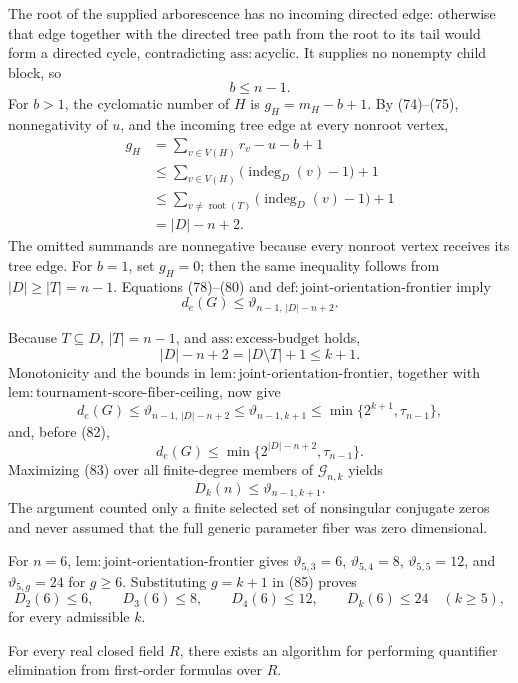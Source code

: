 The root of the supplied arborescence has no incoming directed edge: otherwise that edge together with the directed tree path from the root to its tail would form a directed cycle, contradicting \(\mathrm{ass:acyclic}\).  It supplies no nonempty child block, so
\[
 b\leq n-1.
\tag{79}
\]
For \(b>1\), the cyclomatic number of \(H\) is \(g_H=m_H-b+1\).  By (74)--(75), nonnegativity of \(u\), and the incoming tree edge at every nonroot vertex,
\[
\begin{aligned}
 g_H
 &=\sum_{v\in V(H)}r_v-u-b+1\\
 &\leq\sum_{v\in V(H)}\bigl(\operatorname{indeg}_D(v)-1\bigr)+1\\
 &\leq\sum_{v\ne\operatorname{root}(T)}
       \bigl(\operatorname{indeg}_D(v)-1\bigr)+1\\
 &=|D|-n+2.
\end{aligned}
\tag{80}
\]
The omitted summands are nonnegative because every nonroot vertex receives its tree edge.  For \(b=1\), set \(g_H=0\); then the same inequality follows from \(|D|\geq|T|=n-1\).  Equations (78)--(80) and \(\mathrm{def:joint\mbox{-}orientation\mbox{-}frontier}\) imply
\[
 d_e(G)\leq\vartheta_{n-1,\,|D|-n+2}.
\tag{81}
\]

Because \(T\subseteq D\), \(|T|=n-1\), and \(\mathrm{ass:excess\mbox{-}budget}\) holds,
\[
 |D|-n+2=|D\setminus T|+1\leq k+1.
\tag{82}
\]
Monotonicity and the bounds in \(\mathrm{lem:joint\mbox{-}orientation\mbox{-}frontier}\), together with \(\mathrm{lem:tournament\mbox{-}score\mbox{-}fiber\mbox{-}ceiling}\), now give
\[
 d_e(G)
 \leq\vartheta_{n-1,\,|D|-n+2}
 \leq\vartheta_{n-1,k+1}
 \leq\min\{2^{k+1},\tau_{n-1}\},
\tag{83}
\]
and, before (82),
\[
 d_e(G)\leq\min\{2^{|D|-n+2},\tau_{n-1}\}.
\tag{84}
\]
Maximizing (83) over all finite-degree members of \(\mathcal G_{n,k}\) yields
\[
 D_k(n)\leq\vartheta_{n-1,k+1}.
\tag{85}
\]
The argument counted only a finite selected set of nonsingular conjugate zeros and never assumed that the full generic parameter fiber was zero dimensional.

For \(n=6\), \(\mathrm{lem:joint\mbox{-}orientation\mbox{-}frontier}\) gives \(\vartheta_{5,3}=6\), \(\vartheta_{5,4}=8\), \(\vartheta_{5,5}=12\), and \(\vartheta_{5,g}=24\) for \(g\geq6\).  Substituting \(g=k+1\) in (85) proves
\[
 D_2(6)\leq6,\qquad D_3(6)\leq8,\qquad D_4(6)\leq12,
 \qquad D_k(6)\leq24\quad(k\geq5),
\tag{86}
\]
for every admissible \(k\).

For every real closed field \(R\), there exists an algorithm for performing quantifier elimination from first-order formulas over \(R\).
